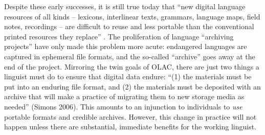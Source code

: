 
Despite these early successes, it is still true today that ``new
digital language resources of all kinds -- lexicons, interlinear
texts, grammars, language maps, field notes, recordings -- are
difficult to reuse and less portable than the conventional printed
resources they replace'' \citep{BirdSimons03language}.  The proliferation of
language ``archiving projects'' have only made this problem more
acute: endangered languages are captured in ephemeral file formats,
and the so-called ``archive'' goes away at the end of the project.
Mirroring the twin goals of OLAC, there are just two things a linguist
must do to ensure that digital data endure: ``(1) the materials must be
put into an enduring file format, and (2) the materials must be
deposited with an archive that will make a practice of migrating them
to new storage media as needed'' (Simons 2006).  This amounts to an
injunction to individuals to \emph{use} portable formats and credible
archives.  However, this change in practice will not happen unless
there are substantial, immediate benefits for the working linguist.


\vspace{1in}




\vspace{1in}

